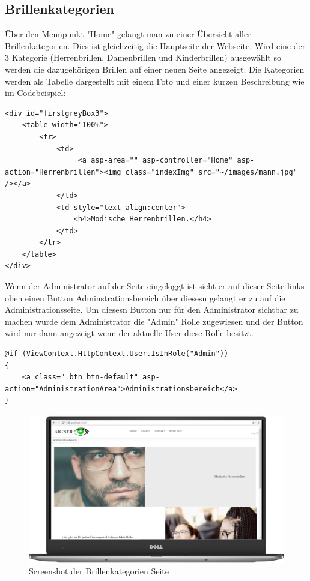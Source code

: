 \subsection{Brillenkategorien}
Über den Menüpunkt "Home" gelangt man zu einer Übersicht aller Brillenkategorien. Dies ist gleichzeitig die Hauptseite der Webseite. Wird eine der 3 Kategorie (Herrenbrillen, Damenbrillen und Kinderbrillen) ausgewählt so werden die dazugehörigen Brillen auf einer neuen Seite angezeigt.
Die Kategorien werden als Tabelle dargestellt mit einem Foto und einer kurzen Beschreibung wie im Codebeispiel:
\begin{lstlisting}
<div id="firstgreyBox3">
    <table width="100%">
        <tr>
            <td>
                 <a asp-area="" asp-controller="Home" asp-action="Herrenbrillen"><img class="indexImg" src="~/images/mann.jpg" /></a> 
            </td>
            <td style="text-align:center">
                <h4>Modische Herrenbrillen.</h4>
            </td>
        </tr>
    </table>
</div>
\end{lstlisting}
Wenn der Administrator auf der Seite eingeloggt ist sieht er auf dieser Seite links oben einen Button Adminstrationsbereich über diesesn gelangt er zu auf die Administrationsseite. Um diesesn Button nur für den Administrator sichtbar zu machen wurde dem Administrator die "Admin" Rolle zugewiesen und der Button wird nur dann angezeigt wenn der aktuelle User diese Rolle besitzt.

\begin{lstlisting}
@if (ViewContext.HttpContext.User.IsInRole("Admin"))
{
    <a class=" btn btn-default" asp-action="AdministrationArea">Administrationsbereich</a>
}
\end{lstlisting}


\begin{figure}[H]
\begin{center}
	\includegraphics[scale=.2]{images/Index.png}
\end{center}
	\caption{Screenshot der Brillenkategorien Seite}
	\label{fig:sample}
\end{figure}

